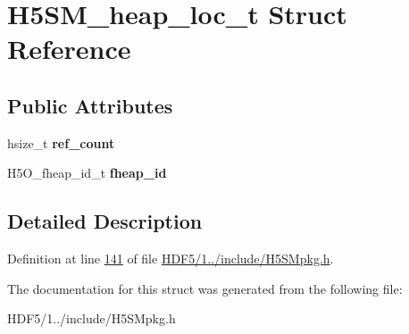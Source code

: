 \hypertarget{struct_h5_s_m__heap__loc__t}{}\section{H5\+S\+M\+\_\+heap\+\_\+loc\+\_\+t Struct Reference}
\label{struct_h5_s_m__heap__loc__t}
\subsection*{Public Attributes}
\begin{DoxyCompactItemize}
\item 
\mbox{\label{struct_h5_s_m__heap__loc__t_aa8aeb476f83c945b17686cb6b41bea99}} 
hsize\+\_\+t {\bfseries ref\+\_\+count}
\item 
\mbox{\label{struct_h5_s_m__heap__loc__t_a59bc3c173877ab77a80ebb9cfddb1791}} 
H5\+O\+\_\+fheap\+\_\+id\+\_\+t {\bfseries fheap\+\_\+id}
\end{DoxyCompactItemize}


\subsection{Detailed Description}


Definition at line \hyperlink{_h_d_f5_21_810_81_2include_2_h5_s_mpkg_8h_source_l00141}{141} of file \hyperlink{_h_d_f5_21_810_81_2include_2_h5_s_mpkg_8h_source}{H\+D\+F5/1../include/\+H5\+S\+Mpkg.\+h}.



The documentation for this struct was generated from the following file\+:\begin{DoxyCompactItemize}
\item 
H\+D\+F5/1../include/\+H5\+S\+Mpkg.\+h\end{DoxyCompactItemize}
